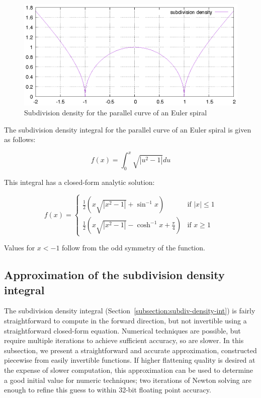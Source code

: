\documentclass[sigconf]{acmart}
\begin{document}
\begin{figure}
    \includegraphics[scale=0.6]{subdiv_density}
    \caption{Subdivision density for the parallel curve of an Euler spiral}
    \label{fig:subdiv_density}
\end{figure}

The subdivision density integral for the parallel curve of an Euler spiral is given as follows:

\[
    f(x) = \int_0^x\sqrt{|u^2 - 1|} du
\]

This integral has a closed-form analytic solution:

\[
    f(x) = \left\{
        \begin{array}{rl}
            \frac{1}{2}(x\sqrt{|x^2-1|} + \sin^{-1}x) & \text{if } |x| \leq 1 \\
            \frac{1}{2}(x\sqrt{|x^2-1|} - \cosh^{-1}x + \frac{\pi}{4}) & \text{if } x \geq 1
        \end{array}
    \right.
\]

Values for $x<-1$ follow from the odd symmetry of the function. 


\subsection{Approximation of the subdivision density integral}

The subdivision density integral (Section~\ref{subsection:subdiv-density-int}) is fairly straightforward to compute in the forward direction, but not invertible using a straightforward closed-form equation. Numerical techniques are possible, but require multiple iterations to achieve sufficient accuracy, so are slower. In this subsection, we present a straightforward and accurate approximation, constructed piecewise from easily invertible functions. If higher flattening quality is desired at the expense of slower computation, this approximation can be used to determine a good initial value for numeric techniques; two iterations of Newton solving are enough to refine this guess to within 32-bit floating point accuracy.
\end{document}
